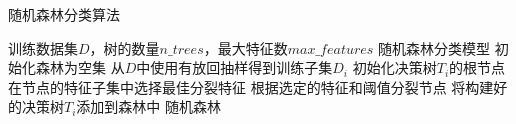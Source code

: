 \documentclass{article}
\begin{document}
	
	\begin{algorithm}
		\caption{随机森林分类算法}
		\begin{algorithmic}[1]
			\Require 训练数据集$D$，树的数量$n\_trees$，最大特征数$max\_features$
			\Ensure 随机森林分类模型
			\State 初始化森林为空集
			\State 从$D$中使用有放回抽样得到训练子集$D_i$
			\State 初始化决策树$T_i$的根节点
			\State 在节点的特征子集中选择最佳分裂特征
			\State 根据选定的特征和阈值分裂节点
			\EndWhile
			\State 将构建好的决策树$T_i$添加到森林中
			\EndFor
			\State \Return 随机森林
		\end{algorithmic}
	\end{algorithm}
	
\end{document}
